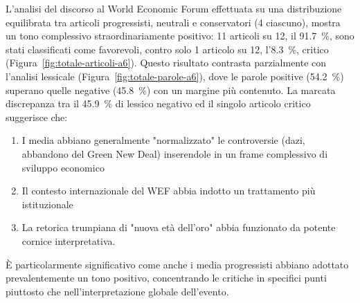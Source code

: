 L'analisi del discorso al World Economic Forum effettuata su una distribuzione equilibrata tra articoli progressisti, neutrali e conservatori (4 ciascuno), mostra un tono complessivo straordinariamente positivo: 11 articoli su 12, il \SI{91.7}{\percent}, sono stati classificati come favorevoli, contro solo 1 articolo su 12, l'\SI{8.3}{\percent}, critico  (Figura~\ref{fig:totale-articoli-a6}). Questo risultato contrasta parzialmente con l'analisi lessicale (Figura~\ref{fig:totale-parole-a6}), dove le parole positive (\SI{54.2}{\percent}) superano quelle negative (\SI{45.8}{\percent}) con un margine più contenuto. La marcata discrepanza tra il \SI{45.9}{\percent} di lessico negativo ed il singolo articolo critico suggerisce che: 
\begin{enumerate}
    \item I media abbiano generalmente "normalizzato" le controversie (dazi, abbandono del Green New Deal) inserendole in un frame complessivo di sviluppo economico
    \item Il contesto internazionale del WEF abbia indotto un trattamento più istituzionale
    \item La retorica trumpiana di "nuova età dell'oro" abbia funzionato da potente cornice interpretativa. 
\end{enumerate}
È particolarmente significativo come anche i media progressisti abbiano adottato prevalentemente un tono positivo, concentrando le critiche in specifici punti piuttosto che nell'interpretazione globale dell'evento.